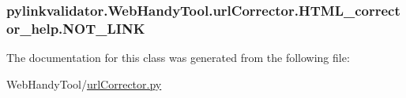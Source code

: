 \subsubsection[{N\+O\+T\+\_\+\+L\+I\+NK}]{\setlength{\rightskip}{0pt plus 5cm}pylinkvalidator.\+Web\+Handy\+Tool.\+url\+Corrector.\+H\+T\+M\+L\+\_\+corrector\+\_\+help.\+N\+O\+T\+\_\+\+L\+I\+NK}\hypertarget{classpylinkvalidator_1_1_web_handy_tool_1_1url_corrector_1_1_h_t_m_l__corrector__help_a5b2cbd7348808b3fa573af6d89fd0bef}{}\label{classpylinkvalidator_1_1_web_handy_tool_1_1url_corrector_1_1_h_t_m_l__corrector__help_a5b2cbd7348808b3fa573af6d89fd0bef}


The documentation for this class was generated from the following file\+:\begin{DoxyCompactItemize}
\item 
Web\+Handy\+Tool/\hyperlink{url_corrector_8py}{url\+Corrector.\+py}\end{DoxyCompactItemize}
